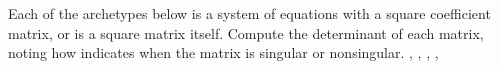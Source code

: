 Each of the archetypes below is a system of equations with a square coefficient matrix, or is a square matrix itself.  Compute the determinant of each matrix, noting how  indicates when the matrix is singular or nonsingular.\newline\newline
{},
,
,
,
